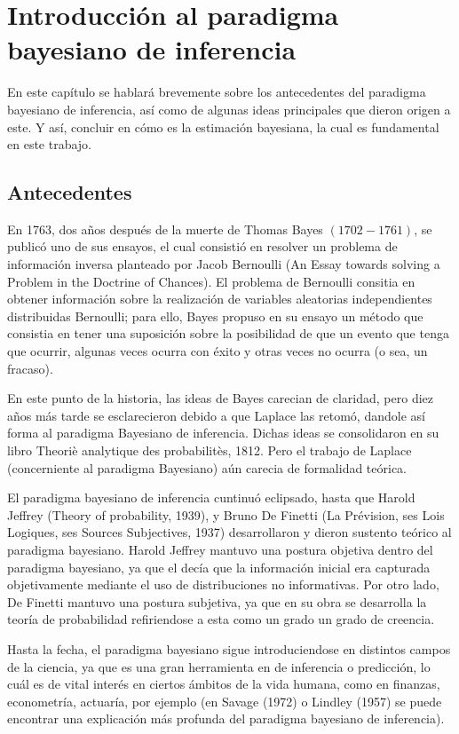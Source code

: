 \chapter{Introducción al paradigma bayesiano de inferencia} 
En este capítulo se hablará brevemente sobre los antecedentes del paradigma bayesiano de inferencia, así como de algunas ideas principales que dieron
origen a este. Y así, concluir en cómo es la estimación bayesiana, la cual es fundamental en este trabajo.

\section{Antecedentes}

En 1763, dos años después de la muerte de Thomas Bayes $(1702-1761)$, se publicó uno de sus ensayos, el cual consistió en resolver un problema de información inversa planteado por Jacob Bernoulli (An Essay towards solving a Problem in the Doctrine
of Chances). El problema de Bernoulli consitia en obtener información sobre la realización de variables aleatorias independientes distribuidas Bernoulli; para ello, Bayes propuso en su ensayo un método que consistia en tener una suposición sobre la posibilidad de que un evento que tenga que ocurrir, algunas veces ocurra con éxito y otras veces no ocurra (o sea, un fracaso).

En este punto de la historia, las ideas de Bayes carecian de claridad, pero diez años más tarde se esclarecieron debido a que Laplace las retomó, dandole así forma al paradigma Bayesiano de inferencia. Dichas ideas se consolidaron en su libro Theoriè analytique des probabilitès, 1812. Pero el trabajo de Laplace (concerniente al paradigma Bayesiano) aún carecia de formalidad teórica.

El paradigma bayesiano de inferencia cuntinuó eclipsado, hasta que Harold Jeffrey (Theory of probability, 1939), y Bruno De Finetti (La Prévision, ses Lois Logiques, ses Sources Subjectives, 1937) desarrollaron y dieron sustento teórico al paradigma bayesiano. Harold Jeffrey mantuvo una postura objetiva dentro del paradigma bayesiano, ya que el decía que la información inicial era capturada objetivamente mediante el uso de distribuciones no informativas. Por otro lado, De Finetti mantuvo una postura subjetiva, ya que en su obra se desarrolla la teoría de probabilidad refiriendose a esta como un grado un grado de creencia.

Hasta la fecha, el paradigma bayesiano sigue introduciendose en distintos campos de la ciencia, ya que es una gran herramienta en de inferencia o predicción, lo cuál es de vital interés en ciertos ámbitos de la vida humana, como en finanzas, econometría, actuaría, por ejemplo (en Savage (1972) o Lindley (1957) se puede encontrar una explicación más profunda del paradigma bayesiano de inferencia). 

